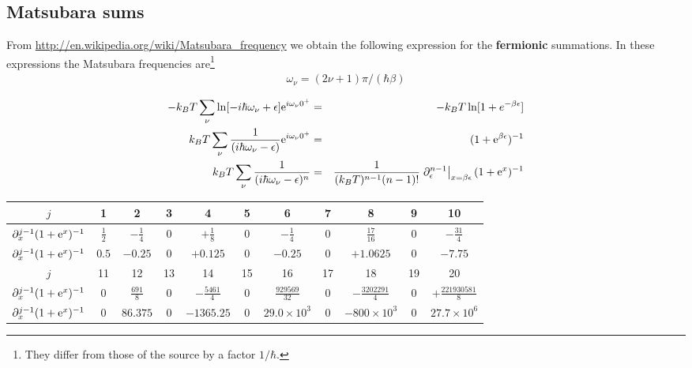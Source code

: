 \documentclass[11pt,a4paper]{report}
\begin{document}
\subsection{Matsubara sums}
From \url{http://en.wikipedia.org/wiki/Matsubara_frequency} we obtain
the following expression for the \textbf{fermionic} summations.  In
these expressions the Matsubara frequencies are\footnote{They differ
  from those of the source by a factor $1/\hbar$.}
\begin{eqnarray}
\omega_\nu=(2\nu+1)\pi/(\hbar\beta)
\end{eqnarray}


\begin{eqnarray}
-k_BT\sum_\nu\ln[-i\hbar\omega_\nu+\epsilon]\mathrm{e}^{i\omega_\nu0^+}
&=&-k_BT\ln[1+e^{-\beta \epsilon}]
\\
k_BT\sum_\nu \frac{1}{(i\hbar\omega_\nu-\epsilon)}\mathrm{e}^{i\omega_\nu 0^+}
&=&(1+\mathrm{e}^{\beta \epsilon})^{-1}
\\
k_BT\sum_\nu \frac{1}{(i\hbar\omega_\nu-\epsilon)^n}
&=&\frac{1}{(k_BT)^{n-1}(n-1)!}
\left.\partial_\epsilon^{n-1}\right|_{x=\beta\epsilon}(1+\mathrm{e}^{x})^{-1}
\end{eqnarray}
\begin{center}
\begin{tabular}{|c|c|c|c|c|c|c|c|c|c|c|}
\hline
$j$& 1 & 2 & 3 & 4 & 5 &6 &7 &8 & 9 & 10\\
\hline
$\partial^{j-1}_x(1+\mathrm{e}^{x})^{-1}$
&$\frac{1}{2}$ 
&$-\frac{1}{4}$ 
&$0$ 
&$+\frac{1}{8}$ 
&$0$ 
&$-\frac{1}{4}$ 
&$0$ 
&$\frac{17}{16}$
&$0$ 
&$-\frac{31}{4}$
\\
\hline
$\partial^{j-1}_x(1+\mathrm{e}^{x})^{-1}$
&$0.5$ 
&$-0.25$ 
&$0$ 
&$+0.125$ 
&$0$ 
&$-0.25$ 
&$0$ 
&$+1.0625$
&$0$ 
&$-7.75$
\\
\hline
\hline
$j$& 11 & 12 & 13 & 14 & 15 &16 &17 &18 & 19 & 20\\
\hline
$\partial^{j-1}_x(1+\mathrm{e}^{x})^{-1}$
&$0$ 
&$\frac{691}{8}$ 
&$0$ 
&$-\frac{5461}{4}$ 
&$0$ 
&$\frac{929569}{32}$ 
&$0$ 
&$-\frac{3202291}{4}$
&$0$ 
&$+\frac{221930581}{8}$
\\
\hline
$\partial^{j-1}_x(1+\mathrm{e}^{x})^{-1}$
&$0$ 
&$86.375$ 
&$0$ 
&$-1365.25$ 
&$0$ 
&$29.0\times10^3$ 
&$0$ 
&$-800\times10^3$
&$0$ 
&$27.7\times 10^6$ %
\\
\hline
\end{tabular}
\end{center}
\end{document}
